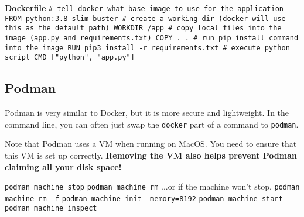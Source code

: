 \textbf{Dockerfile}\newline
\texttt{\# tell docker what base image to use for the application\newline
FROM python:3.8-slim-buster\newline
\newline
\# create a working dir (docker will use this as the default path)\newline
WORKDIR /app\newline
\newline
\# copy local files into the image (app.py and requirements.txt)\newline
COPY . .\newline
\newline
\# run pip install command into the image\newline
RUN pip3 install -r requirements.txt\newline
\newline
\# execute python script\newline
CMD ["python", "app.py"]}\newline



\subsection{Podman}

Podman is very similar to Docker, but it is more secure and lightweight.
In the command line, you can often just swap the \texttt{docker} part of a command to \texttt{podman}.

Note that Podman uses a VM when running on MacOS. You need to ensure that this VM is set up correctly.
\textbf{Removing the VM also helps prevent Podman claiming all your disk space!}

\texttt{podman machine stop}\newline
\texttt{podman machine rm} \enspace ...or if the machine won't stop,\; \texttt{podman machine rm -f}\newline
\texttt{podman machine init --memory=8192}\newline
\texttt{podman machine start}\newline
\texttt{podman machine inspect}

